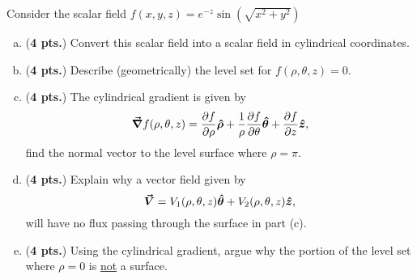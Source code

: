 \documentclass[12pt]{amsbook}
\newcommand{\thetahat}{\boldsymbol{\hat{\theta}}}
\newcommand{\rhohat}{\boldsymbol{\hat{\rho}}}
\begin{document}
\newpage
\begin{problem} Consider the scalar field $f(x,y,z)=e^{-z} \sin(\sqrt{x^2+y^2})$
    \begin{enumerate}[(a)]
                \item (\textbf{4 pts.}) Convert this scalar field into a scalar field in cylindrical coordinates.
                \vspace*{.25cm}
                
                \item (\textbf{4 pts.}) Describe (geometrically) the level set for $f(\rho,\theta,z)=0$. 
                \vspace*{.25cm}
                
                \item (\textbf{4 pts.}) The cylindrical gradient is given by
                \[
                \grad f(\rho,\theta,z) = \frac{\partial f}{\partial \rho}\rhohat + \frac{1}{\rho} \frac{\partial f}{\partial \theta} \thetahat + \frac{\partial f}{\partial z} \zhat,
                \]
                find the normal vector to the level surface where $\rho=\pi$.
                \vspace*{.25cm}
                \item (\textbf{4 pts.}) Explain why a vector field given by
                \[
                \vecfieldV = V_1(\rho,\theta,z)\thetahat + V_2(\rho,\theta,z) \zhat,
                \]
                will have no flux passing through the surface in part (c).
                
                \vspace*{.25cm}
                \item (\textbf{4 pts.}) Using the cylindrical gradient, argue why the portion of the level set where $\rho=0$  is \underline{not} a surface.
                                
                                
                
                
    \end{enumerate}
\end{problem}
\end{document}
